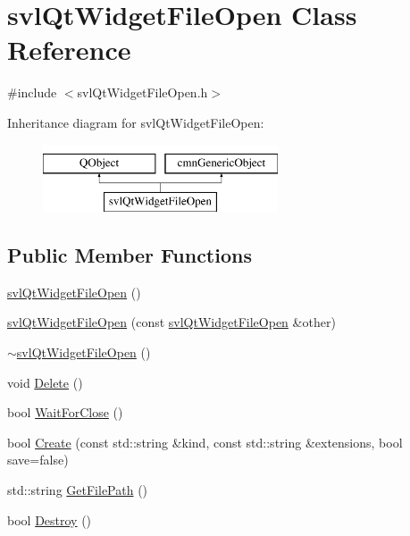 \hypertarget{classsvl_qt_widget_file_open}{\section{svl\-Qt\-Widget\-File\-Open Class Reference}
\label{classsvl_qt_widget_file_open}
}


{\ttfamily \#include $<$svl\-Qt\-Widget\-File\-Open.\-h$>$}

Inheritance diagram for svl\-Qt\-Widget\-File\-Open\-:\begin{figure}[H]
\begin{center}
\leavevmode
\includegraphics[height=2.000000cm]{d4/d89/classsvl_qt_widget_file_open}
\end{center}
\end{figure}
\subsection*{Public Member Functions}
\begin{DoxyCompactItemize}
\item 
\hyperlink{classsvl_qt_widget_file_open_af14a2a63174b9245e9c13039ffda1a29}{svl\-Qt\-Widget\-File\-Open} ()
\item 
\hyperlink{classsvl_qt_widget_file_open_a3629a2a6fe9ba41933dc8d3f2b41d58d}{svl\-Qt\-Widget\-File\-Open} (const \hyperlink{classsvl_qt_widget_file_open}{svl\-Qt\-Widget\-File\-Open} \&other)
\item 
\hyperlink{classsvl_qt_widget_file_open_a4de4d48a0f65f50541316f37ac6b77e2}{$\sim$svl\-Qt\-Widget\-File\-Open} ()
\item 
void \hyperlink{classsvl_qt_widget_file_open_a1c19c8e342d29b80450c859742010c9f}{Delete} ()
\item 
bool \hyperlink{classsvl_qt_widget_file_open_af492c272779e06b2e60cf9d4a7e219c3}{Wait\-For\-Close} ()
\item 
bool \hyperlink{classsvl_qt_widget_file_open_a8a46efd42c1f331d17b780f79779981b}{Create} (const std\-::string \&kind, const std\-::string \&extensions, bool save=false)
\item 
std\-::string \hyperlink{classsvl_qt_widget_file_open_a69877716f9c2bfb90ddfca708684068e}{Get\-File\-Path} ()
\item 
bool \hyperlink{classsvl_qt_widget_file_open_a34cfc78e1b05536d0718586a45ed7a64}{Destroy} ()
\end{DoxyCompactItemize}
